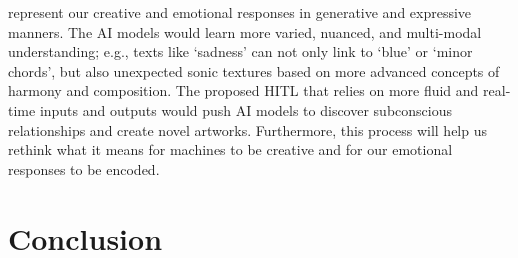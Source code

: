 \documentclass[letterpaper]{article} %
\begin{document}
represent our creative and emotional responses in generative and expressive manners. The AI models would learn more varied, nuanced, and multi-modal understanding; e.g., texts like `sadness' can not only link to `blue' or `minor chords', but also unexpected sonic textures based on more advanced concepts of harmony and composition. The proposed HITL that relies on more fluid and real-time inputs and outputs would push AI models to discover subconscious relationships and create novel artworks. Furthermore, this process will help us rethink what it means for machines to be creative and for our emotional responses to be encoded.

\vspace{-3.02mm}
\section{Conclusion}
\label{conclusion}
\end{document}
